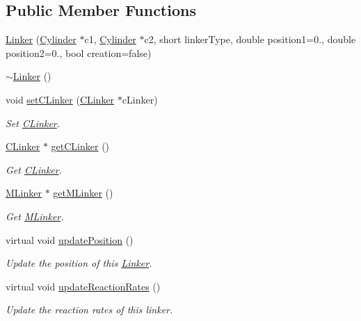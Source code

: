 \subsection*{Public Member Functions}
\begin{DoxyCompactItemize}
\item 
\hyperlink{classLinker_a2bdcb58c2db8008d10ffcf9bedc6b27a}{Linker} (\hyperlink{classCylinder}{Cylinder} $\ast$c1, \hyperlink{classCylinder}{Cylinder} $\ast$c2, short linker\+Type, double position1=0., double position2=0., bool creation=false)
\item 
\hyperlink{classLinker_ad9d5113b11d6344146424aa62c4a48dc}{$\sim$\+Linker} ()
\item 
void \hyperlink{classLinker_a7a1036140d099d4431ee163a297c2770}{set\+C\+Linker} (\hyperlink{classCLinker}{C\+Linker} $\ast$c\+Linker)
\begin{DoxyCompactList}\small\item\em Set \hyperlink{classCLinker}{C\+Linker}. \end{DoxyCompactList}\item 
\hyperlink{classCLinker}{C\+Linker} $\ast$ \hyperlink{classLinker_a3bf1d1c8e7f9d126f976213809c46e61}{get\+C\+Linker} ()
\begin{DoxyCompactList}\small\item\em Get \hyperlink{classCLinker}{C\+Linker}. \end{DoxyCompactList}\item 
\hyperlink{classMLinker}{M\+Linker} $\ast$ \hyperlink{classLinker_a45d42b35d017a9a67da09d927ef4e371}{get\+M\+Linker} ()
\begin{DoxyCompactList}\small\item\em Get \hyperlink{classMLinker}{M\+Linker}. \end{DoxyCompactList}\item 
virtual void \hyperlink{classLinker_aa268869b1ed75f38973aafd1362a5c42}{update\+Position} ()
\begin{DoxyCompactList}\small\item\em Update the position of this \hyperlink{classLinker}{Linker}. \end{DoxyCompactList}\item 
virtual void \hyperlink{classLinker_a2903d3c1f696dd07a9dbbd02d930b050}{update\+Reaction\+Rates} ()
\begin{DoxyCompactList}\small\item\em Update the reaction rates of this linker. \end{DoxyCompactList}\item 

\end{DoxyCompactItemize}
